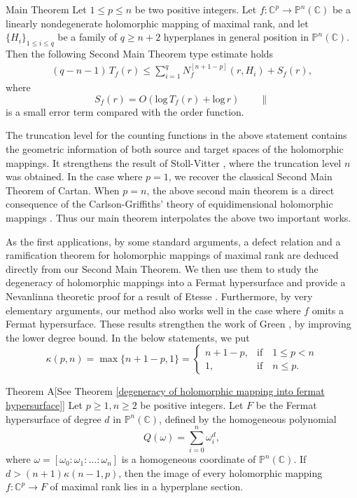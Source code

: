 \documentclass[english, 12pt]{amsart}
\def\log{\mathrm{log}\,}
\theoremstyle{plain}
\theoremstyle{remark}
\numberwithin{equation}{section}
\theoremstyle{plain}
\newcommand{\thistheoremname}{}
\newtheorem*{genericthm*}{\thistheoremname}
\newenvironment{namedthm*}[1]{\renewcommand{\thistheoremname}{#1}%
	\begin{genericthm*}}
	{\end{genericthm*}}
\theoremstyle{named}
\begin{document}
\begin{namedthm*}{Main Theorem} Let $1\leq p\leq n$ be two positive integers.
	Let $f:\mathbb{C}^p\rightarrow\mathbb{P}^n(\mathbb{C})$ be a linearly nondegenerate  holomorphic mapping of maximal rank, and let $\{H_i\}_{1\leq i\leq q}$ be a family of $q\geq n+2$ hyperplanes in general position in $\mathbb{P}^n(\mathbb{C})$. Then the following Second Main Theorem type estimate holds
		\begin{align}
		\label{smt statement}
		(
		q
		-
		n-1
		)\,
		T_{f}(r)\leq\sum_{i=1}^q N_{f}^{[n+1-p]}(r,H_i)
		+
		S_{f}(r),
		\end{align}
		where 
		$$S_f(r)=O(\log T_f(r)+\log r)\qquad\parallel
		$$ is a small error term compared with the order function.
		
	\end{namedthm*}
The truncation level for the counting functions in the above statement contains the geometric information of both source and target spaces of the holomorphic mappings. It strengthens the result of Stoll-Vitter \cite{Stoll54, Vitter77},  where the truncation level $n$ was obtained.  In the case where $p=1$, we  recover the classical Second Main Theorem of Cartan. When $p=n$, the above second main theorem  is a direct consequence of the Carlson-Griffiths' theory of equidimensional holomorphic mappings \cite{Carlson-Griffiths 72}. Thus our main theorem interpolates the above two important works.



As the first applications, by some standard arguments, a defect relation and a ramification theorem for holomorphic mappings of maximal rank are deduced directly from our Second Main Theorem. We then use them to study the degeneracy of holomorphic mappings into  a Fermat hypersurface and provide a Nevanlinna theoretic proof for a result of Etesse \cite[Theorem 2.2.2]{Etesse2023}. Furthermore, by very elementary arguments, our method also works well in the case where $f$ omits a Fermat hypersurface. These results strengthen the work of Green \cite{Green75}, by improving the lower degree bound. In the below statements, we put 
$$
\kappa(p,n)=
\max\{n+1-p,1\}
=
\begin{cases}
n+1-p,&\text{if}\quad 1\leq p< n\\
1,&\text{if} \quad n\leq p.
\end{cases}
$$

\begin{namedthm*}{Theorem A}[See Theorem \ref{degeneracy of holomorphic mapping into fermat hypersurface}]
	Let $p\geq 1,n\geq2$ be positive integers. Let $F$ be the Fermat hypersurface of degree $d$ in $\mathbb{P}^n(\mathbb{C})$, defined by the homogeneous polynomial 
	$$
	Q(\omega)=\sum_{i=0}^n\omega_i^d,
	$$
	where $\omega=[\omega_0:\omega_1:\dots:\omega_n]$ is a homogeneous coordinate of $\mathbb{P}^n(\mathbb{C})$.
	If $d>(n+1)\kappa(n-1,p)$, then the image of every holomorphic mapping $f\colon\mathbb{C}^p\rightarrow F$ of maximal rank lies in a hyperplane section.
\end{namedthm*}
\end{document}
